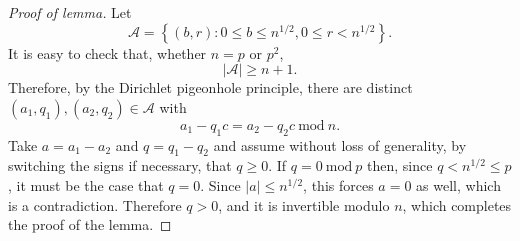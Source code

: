 \documentclass[10pt,a4paper]{amsart}
\newcommand{\mc}{\mathcal}
\begin{document}
\begin{proof}[Proof of lemma]
Let
\[\mc{A}=\left\{(b,r): 0\le b\le n^{1/2}, 0\le r<n^{1/2}\right\}.\]
It is easy to check that, whether $n=p$ or $p^2$,
\[|\mc{A}|\ge n+1.\]
Therefore, by the Dirichlet pigeonhole principle, there are distinct $(a_1,q_1),(a_2,q_2)\in\mc{A}$ with
\[a_1-q_1c=a_2-q_2c~\mathrm{mod}~n.\]
Take $a=a_1-a_2$ and $q=q_1-q_2$ and assume without loss of generality, by switching the signs if necessary, that $q\ge 0$. If $q=0~\mathrm{mod}~p$ then, since $q<n^{1/2}\le p$, it must be the case that $q=0$. Since $|a|\le n^{1/2}$, this forces $a=0$ as well, which is a contradiction. Therefore $q>0$, and it is invertible modulo $n$, which completes the proof of the lemma.
\end{proof}
\end{document}

